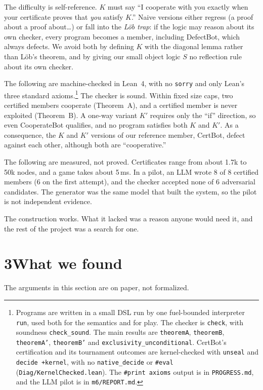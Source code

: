 \documentclass[11pt]{article}
\begin{document}
The difficulty is self-reference. $K$ must say ``I cooperate with you exactly when your certificate proves that \emph{you} satisfy $K$.'' Naive versions either regress (a proof about a proof about\ldots) or fall into the \emph{Löb trap}: if the logic may reason about its own checker, every program becomes a member, including DefectBot, which always defects. We avoid both by defining $K$ with the diagonal lemma rather than Löb's theorem, and by giving our small object logic $S$ no reflection rule about its own checker.

The following are machine-checked in Lean~4, with no \texttt{sorry} and only Lean's three standard axioms.\footnote{Programs are written in a small DSL run by one fuel-bounded interpreter \texttt{run}, used both for the semantics and for play. The checker is \texttt{check}, with soundness \texttt{check\_sound}. The main results are \texttt{theoremA}, \texttt{theoremB}, \texttt{theoremA'}, \texttt{theoremB'} and \texttt{exclusivity\_unconditional}. CertBot's certification and its tournament outcomes are kernel-checked with \texttt{unseal} and \texttt{decide +kernel}, with no \texttt{native\_decide} or \texttt{\#eval} (\texttt{Diag/KernelChecked.lean}). The \texttt{\#print axioms} output is in \texttt{PROGRESS.md}, and the LLM pilot is in \texttt{m6/REPORT.md}.} The checker is sound. Within fixed size caps, two certified members cooperate (Theorem~A), and a certified member is never exploited (Theorem~B). A one-way variant $K'$ requires only the ``if'' direction, so even CooperateBot qualifies, and no program satisfies both $K$ and $K'$. As a consequence, the $K$ and $K'$ versions of our reference member, CertBot, defect against each other, although both are ``cooperative.''

The following are measured, not proved. Certificates range from about 1.7k to 50k nodes, and a game takes about 5\,ms. In a pilot, an LLM wrote 8 of 8 certified members (6 on the first attempt), and the checker accepted none of 6 adversarial candidates. The generator was the same model that built the system, so the pilot is not independent evidence.

The construction works. What it lacked was a reason anyone would need it, and the rest of the project was a search for one.

\section*{3\quad What we found}

The arguments in this section are on paper, not formalized.
\end{document}

